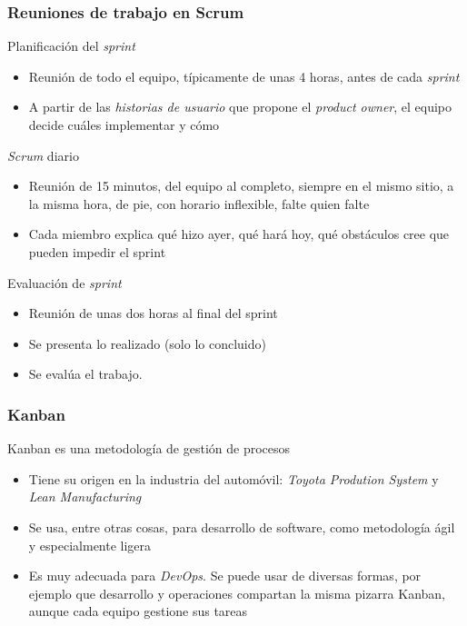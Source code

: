 \documentclass[ucs]{beamer}
\begin{document}
\begin{frame}[fragile]
\frametitle{Reuniones de trabajo en Scrum}

Planificación del
\emph{sprint}
\begin{itemize}
\item
Reunión de todo el equipo, típicamente de unas 4 horas, antes
de cada
\emph{sprint}


\item
A partir de las
\emph{historias de usuario}
que propone el 
\emph{product owner},
el equipo decide cuáles implementar y cómo
\end{itemize}


\emph{Scrum} diario

\begin{itemize}
\item
Reunión de
15 minutos, del equipo al completo, siempre en el mismo sitio, a la misma hora, de pie,
con horario inflexible, falte quien falte

\item
Cada miembro
explica
qué hizo ayer,
qué hará hoy,
qué obstáculos cree que pueden impedir el sprint
\end{itemize}

Evaluación de 
\emph{sprint} 


\begin{itemize}
\item
Reunión de unas dos horas al final del sprint 

\item
Se presenta lo realizado (solo lo concluido)

\item
Se evalúa el trabajo.
\end{itemize}
\end{frame}



\begin{frame}[fragile]
\frametitle{Kanban}
Kanban es una metodología de gestión de procesos
\begin{itemize}

\item
Tiene su origen en la industria del automóvil:  \emph{Toyota Prodution System} y \emph{Lean Manufacturing}

\item
Se usa, entre otras cosas, para desarrollo de software, como
metodología ágil y especialmente ligera

\item
Es muy adecuada para \emph{DevOps}. Se puede usar de diversas formas,
por ejemplo que desarrollo y operaciones compartan la misma pizarra Kanban,
aunque cada equipo gestione sus tareas

\end{itemize}
\end{frame}
\end{document}
